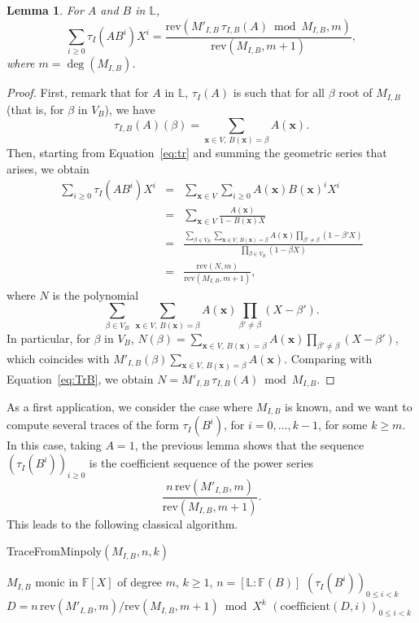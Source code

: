 \documentclass[12pt]{article}
\def\F {\ensuremath{\mathbb{F}}}
\def\L {\ensuremath{\mathbb{L}}}
\def\coeff {\ensuremath{\mathrm{coefficient}}}
\def\rev {\ensuremath{\mathrm{rev}}}
\def\x {\ensuremath{\mathbf{x}}}
\newtheorem{Lemma}{Lemma}
\begin{document}
\begin{Lemma}\label{lemma:trace:1}
  For $A$ and $B$ in $\L$, 
  $$\sum_{i \ge 0} \tau_I(A B^i) X^i = \frac{\rev( M'_{I,B}\, \tau_{I,B}
    (A) \bmod M_{I,B},m)}{\rev(M_{I,B},m+1)},$$ where
  $m=\deg(M_{I,B})$.
\end{Lemma}
\begin{proof}
First, remark that for $A$ in $\L$, $\tau_{I}(A)$ is such that for all
$\beta$ root of $M_{I,B}$ (that is, for $\beta$ in $V_B$), we have
\begin{equation}\label{eq:TrB}
\tau_{I,B}(A)(\beta) = \sum_{\x \in V,\, B(\x)=\beta} A(\x).  
\end{equation}
Then, starting from Equation~\eqref{eq:tr} and summing the geometric
series that arises, we obtain
\begin{eqnarray*}
\sum_{i \ge 0} \tau_I(A B^i) X^i &=& \sum_{\x \in V} \sum_{i \ge 0} A(\x)B(\x)^i X^i\\
&=& \sum_{\x \in V} \frac{A(\x)}{1-B(\x)X}\\
&=& \frac{\sum_{\beta \in V_B} \sum_{\x \in V,\, B(\x)=\beta} A(\x) \prod_{\beta'\ne \beta} (1-\beta' X)}
    {\prod_{\beta \in V_B}(1-\beta X)}\\
&=& \frac{\rev(N,m)}{\rev(M_{I,B},m+1)},
\end{eqnarray*}
where $N$ is the polynomial
$$\sum_{\beta \in V_B}\ \sum_{\x \in V,\, B(\x)=\beta} A(\x) \prod_{\beta'\ne \beta} (X-\beta' ).$$
In particular, for  $\beta$ in $V_B$, $N(\beta)=\sum_{\x \in V,\, B(\x)=\beta} A(\x) \prod_{\beta'\ne \beta} (X-\beta' )$,
which coincides with $M'_{I,B}(\beta)\sum_{\x \in V,\, B(\x)=\beta} A(\x)$.
Comparing with Equation~\eqref{eq:TrB}, we obtain 
$N=M'_{I,B}\, \tau_{I,B}(A) \bmod M_{I,B}$.
\end{proof}

As a first application, we consider the case where $M_{I,B}$ is known,
and we want to compute several traces of the form $\tau_I(B^i)$, for
$i=0,\dots,k-1$, for some $k \ge m$. In this case, taking $A=1$, the
previous lemma shows that the sequence $(\tau_I(B^i))_{i \ge 0}$ is
the coefficient sequence of the power series
  $$ \frac{n\, \rev(M'_{I,B} ,m)}{\rev(M_{I,B},m+1)}.$$ This leads to
the following classical algorithm.

\begin{algorithm}[H]
  \caption{TraceFromMinpoly$(M_{I,B}, n, k)$}
  \begin{algorithmic}[1]
    \REQUIRE  $M_{I,B}$ monic in $\F[X]$ of degree $m$, $k \ge 1$, $n=[\L:\F(B)]$    
    \ENSURE $(\tau_I(B^i))_{0 \le i < k}$
    \STATE\label{algo:minpolytotrace:1} $D = n\, \rev(M'_{I,B}, m)/\rev(M_{I,B}, m+1) \bmod X^k$
    \RETURN $(\coeff(D,i))_{0 \le i < k}$
  \end{algorithmic}
  \label{algo:minpolytotrace}
\end{algorithm}
\end{document}

